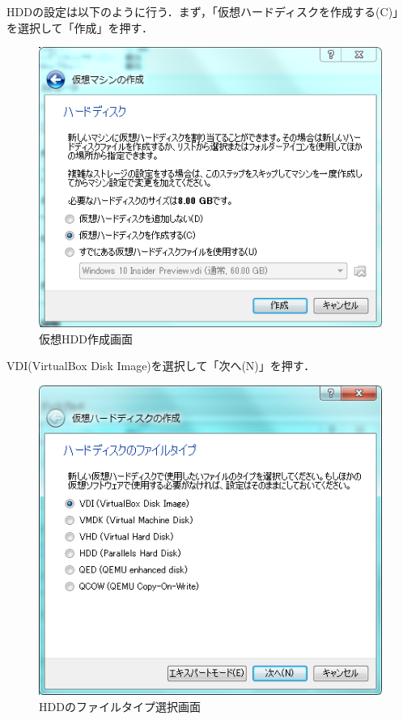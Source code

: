 HDDの設定は以下のように行う．まず，「仮想ハードディスクを作成する(C)」を選択して「作成」を押す．

\begin{figure}[H]
\centering
\includegraphics[width=13cm]{vdi_create.PNG}
\caption{仮想HDD作成画面}\label{vdicreate}
\end{figure}

VDI(VirtualBox Disk Image)を選択して「次へ(N)」を押す．

\begin{figure}[H]
\centering
\includegraphics[width=13cm]{vdi_type.PNG}
\caption{HDDのファイルタイプ選択画面}\label{vditype}
\end{figure}

